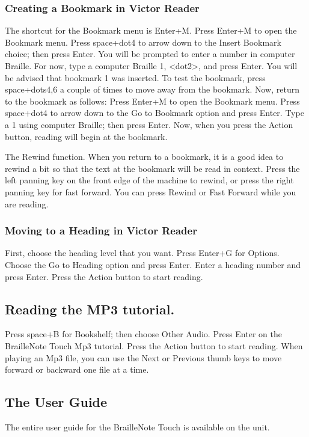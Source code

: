 \documentclass[10pt,letterpaper,twoside]{report}
\begin{document}
{{{\subsubsection{Creating a Bookmark in Victor Reader}
 The shortcut for the Bookmark menu is Enter+M. Press Enter+M to open the Bookmark menu. Press space+dot4 to arrow down to the Insert Bookmark choice; then press Enter. You will be prompted to enter a number in computer Braille. For now, type a computer Braille 1, <dot2>, and press Enter. You will be advised that bookmark 1 was inserted.
To test the bookmark, press space+dots4,6 a couple of times to move away from the bookmark. Now, return to the bookmark as follows:
Press Enter+M to open the Bookmark menu. Press space+dot4 to arrow down to the Go to Bookmark option and press Enter.
Type a 1 using computer Braille; then press Enter. Now, when you press the Action button, reading will begin at the bookmark.

The Rewind function. When you return to a bookmark, it is a good idea to rewind a bit so that the text at the bookmark will be read in context. Press the left panning key on the front edge of the machine to rewind, or press the right panning key for fast forward. You can press Rewind or Fast Forward while you are reading.
\subsubsection{Moving to a Heading in Victor Reader}
First, choose the heading level that you want. Press Enter+G for Options. Choose the Go to Heading option and press Enter. Enter a heading number and press Enter. Press the Action button to start reading.

\subsection{Reading the MP3 tutorial.}
Press space+B for Bookshelf; then choose Other Audio. Press Enter on the BrailleNote Touch Mp3 tutorial. Press the Action button to start reading. When playing an Mp3 file, you can use the Next or Previous thumb keys to move forward or backward one file at a time.

\subsection{The User Guide}

The entire user guide for the BrailleNote Touch is available on the unit.

}}}
\end{document}
